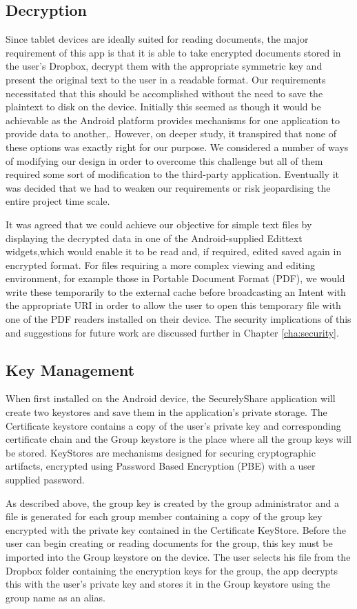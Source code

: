 \subsection*{Decryption }
Since tablet devices are ideally suited for reading documents, the major requirement of this app is that it is able to take encrypted documents stored in the user's Dropbox,  decrypt them with the appropriate symmetric key and present the original text to the user in a readable format.  Our requirements necessitated that this should be accomplished without the need to save the plaintext to disk on the device.  Initially this seemed as though it would be achievable as the Android platform provides mechanisms for one application to provide data to another,.  However, on deeper study, it transpired that none of these options was exactly right for our purpose.  We considered a number of ways of modifying our design in order to overcome this challenge  but all of them required some sort of modification to the third-party application.  Eventually it was decided that we had to weaken our requirements or risk jeopardising the entire project time scale. 

It was agreed that we could achieve our objective for simple text files by displaying the decrypted data in one of the Android-supplied Edittext widgets,which would enable it to be read and, if required, edited saved again in encrypted format.  For files requiring a more complex viewing and editing environment, for example those in Portable Document Format (PDF), we would write these temporarily to the external cache before broadcasting an Intent with the appropriate URI in order to allow the user to open this temporary file with one of the PDF readers installed on their device.  The security implications of this and suggestions for future work are discussed further in Chapter \ref{cha:security}.


\subsection*{Key Management }
When first installed on the Android device, the SecurelyShare application will create two keystores and save them in the application's private storage.  The Certificate keystore contains a copy of the user's private key and corresponding certificate chain and the Group keystore is the place where all the group keys will be stored.  KeyStores are mechanisms designed for securing cryptographic artifacts, encrypted using Password Based Encryption (PBE) with a user supplied password.  

As described above, the group key is created by the group administrator and a file is generated for each group member containing a copy of the group key encrypted with the private key contained in the Certificate KeyStore.  Before the user can begin creating or reading documents for the group, this key must be imported into the Group keystore on the device.  The user selects his file from the Dropbox folder containing the encryption keys for the group, the app decrypts this with the user's private key and stores it in the Group keystore using the group name as an alias.  





